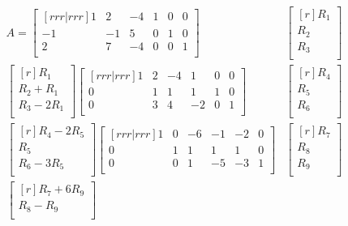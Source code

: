 \documentclass[12pt]{article}
\begin{document}
\begin{enumerate}
	\begin{align*}
	A= 
	\begin{bmatrix}[rrr|rrr]
	1 & 2 & -4 & 1 & 0 & 0\\
	-1 & -1 & 5 & 0 & 1 & 0\\
	2 & 7 & -4 & 0 & 0 & 1\\	
	\end{bmatrix}&
	\begin{bmatrix}[r] R_1\\ R_2\\ R_3\\ \end{bmatrix}\\
	\begin{bmatrix}[r]
	R_1\\
	R_2 + R_1\\
	R_3 - 2R_1\\
	\end{bmatrix}
	\begin{bmatrix}[rrr|rrr]
	1 & 2 & -4 & 1 & 0 & 0\\
	0 & 1 & 1 & 1 & 1 & 0\\
	0 & 3 & 4 & -2 & 0 & 1\\
	\end{bmatrix}&
	\begin{bmatrix}[r] R_4\\ R_5\\ R_6\\ \end{bmatrix}\\
	\begin{bmatrix}[r]
	R_4 - 2R_5\\
	R_5\\
	R_6 - 3R_5\\
	\end{bmatrix}
	\begin{bmatrix}[rrr|rrr]
	1 & 0 & -6 & -1 & -2 & 0\\
	0 & 1 & 1 & 1 & 1 & 0\\
	0 & 0 & 1 & -5 & -3 & 1\\
	\end{bmatrix}&
	\begin{bmatrix}[r] R_7\\ R_8\\ R_9\\ \end{bmatrix} \\
	\begin{bmatrix}[r]
	R_7 + 6R_9\\
	R_8 - R_9\\

\end{bmatrix}
\end{align*}
\end{enumerate}
\end{document}
